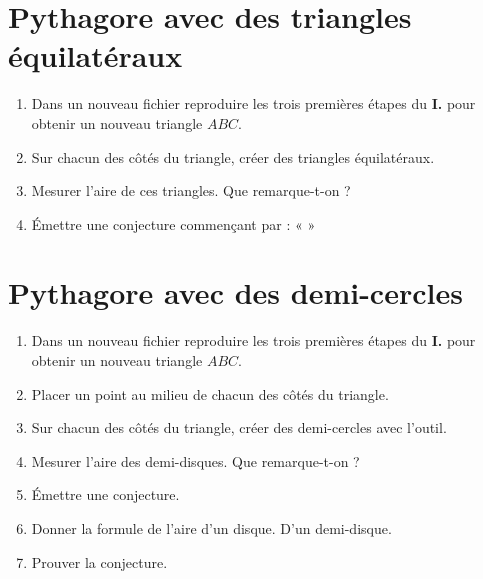 \section{Pythagore avec des triangles équilatéraux}

\begin{enumerate}
    \item Dans un nouveau fichier \Geogebra \def\iconPath{geogebra/} reproduire les trois premières étapes du \textbf{\color{Red}I.} pour obtenir un nouveau triangle $ABC$.
    \item Sur chacun des côtés du triangle, créer des triangles équilatéraux.\\
    \item Mesurer l'aire de ces triangles. Que remarque-t-on ?\\
    \item Émettre une conjecture commençant par :
    «
    »
\end{enumerate}

\section{Pythagore avec des demi-cercles}

\begin{enumerate}
    \item Dans un nouveau fichier \Geogebra \def\iconPath{geogebra/} reproduire les trois premières étapes du \textbf{\color{Red}I.} pour obtenir un nouveau triangle $ABC$.
    \item Placer un point au milieu de chacun des côtés du triangle.\\
    \item Sur chacun des côtés du triangle, créer des demi-cercles avec l'outil.\\
    \item Mesurer l'aire des demi-disques. Que remarque-t-on ?
    \item Émettre une conjecture.
    \item Donner la formule de l'aire d'un disque. D'un demi-disque.
    \item Prouver la conjecture.\\
\end{enumerate}
